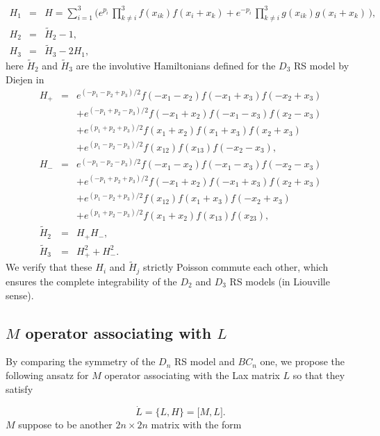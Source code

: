 \documentclass[a4paper,12pt]{article}
\begin{document}
\begin{eqnarray}
H_{1} &=&H=\sum_{i=1}^{3}\Big(e^{p_{i}}\,\prod_{k\neq
i}^{3}f(x_{ik})f(x_{i}+x_{k})+e^{-p_{i}}\,\prod_{k\neq
i}^{3}g(x_{ik})g(x_{i}+x_{k})\,\Big),  \nonumber \\
H_{2} &=&\widetilde{H}_{2}-1, \\
H_{3} &=&\widetilde{H}_{3}-2H_{1},
\end{eqnarray}
here $\widetilde{H}_{2}$ and $\widetilde{H}_{3}$ are the involutive
Hamiltonians defined for the $D_{3}$ RS model by Diejen in \cite{di}
\begin{eqnarray}
H_{+}
&=&e^{(-p_{1}-p_{2}+p_{3})/2}f(-x_{1}-x_{2})f(-x_{1}+x_{3})f(-x_{2}+x_{3})
\nonumber \\
&&+e^{(-p_{1}+p_{2}-p_{3})/2}f(-x_{1}+x_{2})f(-x_{1}-x_{3})f(x_{2}-x_{3})
\nonumber \\
&&+e^{(p_{1}+p_{2}+p_{3})/2}f(x_{1}+x_{2})f(x_{1}+x_{3})f(x_{2}+x_{3})
\nonumber \\
&&+e^{(p_{1}-p_{2}-p_{3})/2}f(x_{12})f(x_{13})f(-x_{2}-x_{3}), \\
H_{-}
&=&e^{(-p_{1}-p_{2}-p_{3})/2}f(-x_{1}-x_{2})f(-x_{1}-x_{3})f(-x_{2}-x_{3})
\nonumber \\
&&+e^{(-p_{1}+p_{2}+p_{3})/2}f(-x_{1}+x_{2})f(-x_{1}+x_{3})f(x_{2}+x_{3})
\nonumber \\
&&+e^{(p_{1}-p_{2}+p_{3})/2}f(x_{12})f(x_{1}+x_{3})f(-x_{2}+x_{3})  \nonumber
\\
&&+e^{(p_{1}+p_{2}-p_{3})/2}f(x_{1}+x_{2})f(x_{13})f(x_{23}), \\
\widetilde{H}_{2} &=&H_{+}H_{-}, \\
\widetilde{H}_{3} &=&H_{+}^{2}+H_{-}^{2}.
\end{eqnarray}
We verify that these $H_{i}$ and $\widetilde{H}_{j}$ strictly Poisson
commute each other, which ensures the complete integrability of the $D_{2}$
and $D_{3}$ RS models (in Liouville sense).

\subsection{$M$ operator associating with $L$}

By comparing the symmetry of the $D_{n}$ RS model and $BC_{n}$ one, we
propose the following ansatz for $M$ operator associating with the Lax
matrix $L$ so that they satisfy

\begin{equation}
\dot{L}=\{L,H\}=\lbrack M,L\rbrack .  \label{laxequ}
\end{equation}
$M$ suppose to be another $2n\times 2n$ matrix with the form
\end{document}
